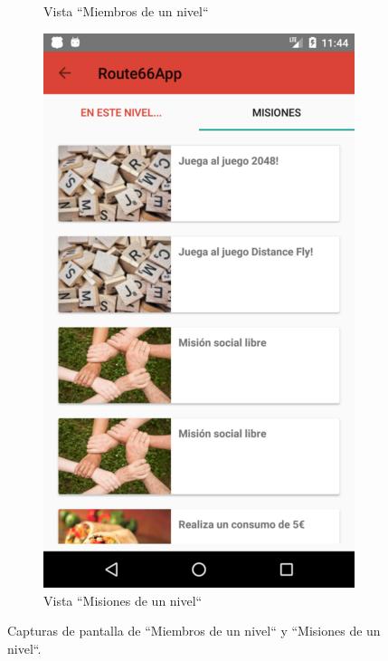 \documentclass[twoside]{report}
\begin{document}
\begin{figure}[H]
\begin{center}
\begin{subfigure}[t]{.3\linewidth}
		\caption{Vista “Miembros de un nivel“}
	\end{subfigure}\hspace{5mm}%
	\begin{subfigure}[t]{.3\linewidth}
		\includegraphics[scale=0.2]{images/userguide/24.png}
		\caption{Vista “Misiones de un nivel“}
	\end{subfigure}\hspace{5mm}%
\caption{Capturas de pantalla de “Miembros de un nivel“ y “Misiones de un nivel“.}
\end{center}
\end{figure}
\end{document}

